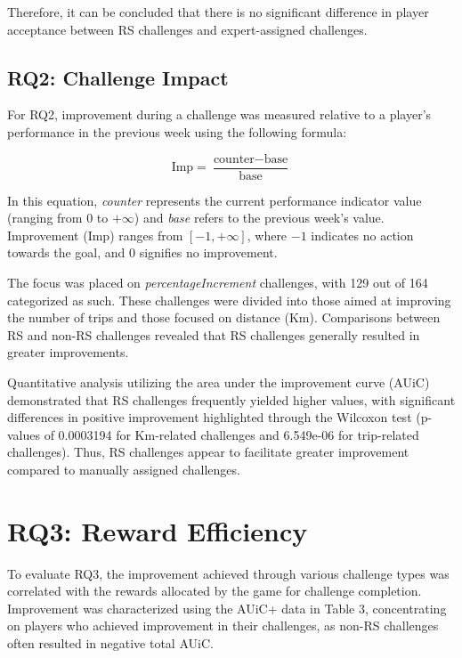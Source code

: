Therefore, it can be concluded that there is no significant difference in player acceptance between RS challenges and expert-assigned challenges.

\subsection{RQ2: Challenge Impact}

For RQ2, improvement during a challenge was measured relative to a player’s performance in the previous week using the following formula:

\begin{equation}
\text{Imp} = \frac{\text{counter} - \text{base}}{\text{base}}
\end{equation}

In this equation, \textit{counter} represents the current performance indicator value (ranging from $0$ to $+\infty$) and \textit{base} refers to the previous week’s value. Improvement ($\text{Imp}$) ranges from $\left[-1, +\infty\right]$, where $-1$ indicates no action towards the goal, and $0$ signifies no improvement.

The focus was placed on \textit{percentageIncrement} challenges, with 129 out of 164 categorized as such. These challenges were divided into those aimed at improving the number of trips and those focused on distance (Km). Comparisons between RS and non-RS challenges revealed that RS challenges generally resulted in greater improvements.

Quantitative analysis utilizing the area under the improvement curve (AUiC) demonstrated that RS challenges frequently yielded higher values, with significant differences in positive improvement highlighted through the Wilcoxon test (p-values of 0.0003194 for Km-related challenges and 6.549e-06 for trip-related challenges). Thus, RS challenges appear to facilitate greater improvement compared to manually assigned challenges.

\section{RQ3: Reward Efficiency}

To evaluate RQ3, the improvement achieved through various challenge types was correlated with the rewards allocated by the game for challenge completion. Improvement was characterized using the AUiC+ data in Table 3, concentrating on players who achieved improvement in their challenges, as non-RS challenges often resulted in negative total AUiC.

